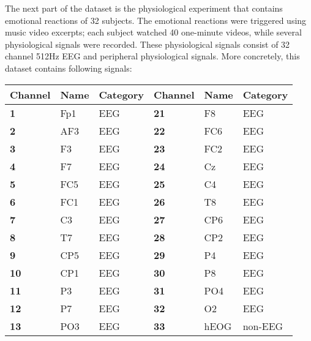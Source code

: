 The next part of the dataset is the physiological experiment that contains emotional reactions of 32 subjects. The emotional reactions were triggered using music video excerpts; each subject watched 40 one-minute videos, while several physiological signals were recorded. These physiological signals consist of 32 channel 512Hz EEG and peripheral physiological signals. More concretely, this dataset contains following signals:
\begin{table}[H]
\centering
\begin{tabular}{l|ll|l|ll}
\textbf{Channel} & \textbf{Name} & \textbf{Category} & \textbf{Channel} & \textbf{Name}    & \textbf{Category} \\ \hline
\textbf{1}       & Fp1           & EEG               & \textbf{21}      & F8               & EEG               \\
\textbf{2}       & AF3           & EEG               & \textbf{22}      & FC6              & EEG               \\
\textbf{3}       & F3            & EEG               & \textbf{23}      & FC2              & EEG               \\
\textbf{4}       & F7            & EEG               & \textbf{24}      & Cz               & EEG               \\
\textbf{5}       & FC5           & EEG               & \textbf{25}      & C4               & EEG               \\
\textbf{6}       & FC1           & EEG               & \textbf{26}      & T8               & EEG               \\
\textbf{7}       & C3            & EEG               & \textbf{27}      & CP6              & EEG               \\
\textbf{8}       & T7            & EEG               & \textbf{28}      & CP2              & EEG               \\
\textbf{9}       & CP5           & EEG               & \textbf{29}      & P4               & EEG               \\
\textbf{10}      & CP1           & EEG               & \textbf{30}      & P8               & EEG               \\
\textbf{11}      & P3            & EEG               & \textbf{31}      & PO4              & EEG               \\
\textbf{12}      & P7            & EEG               & \textbf{32}      & O2               & EEG               \\
\textbf{13}      & PO3           & EEG               & \textbf{33}      & hEOG             & non-EEG           \\

\end{tabular}
\end{table}

